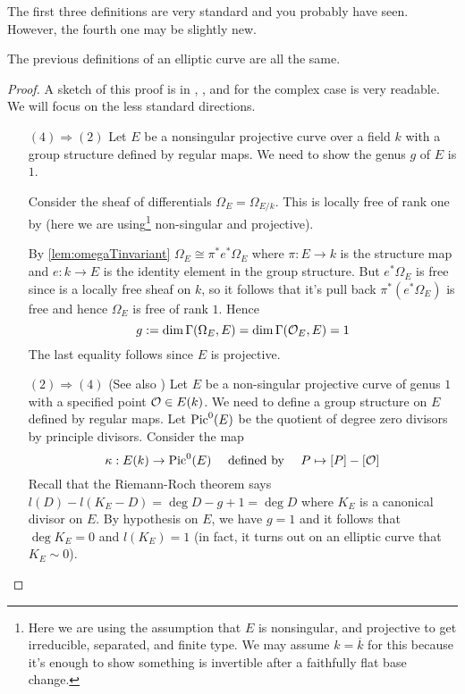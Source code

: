 \documentclass[11pt]{article}
\begin{document}
The first three definitions are very standard and you probably have seen. However, the fourth one may be slightly new.

\begin{prop}\label{ec:defs:equiv}
	The previous definitions of an elliptic curve are all the same.
\end{prop}
\begin{proof}
	A sketch of this proof is in \cite[Pg.~1]{milneAV}, \cite[Ch.~II]{milneEC}, and for the complex case \cite[Ch.~1.3]{diamondandshurman} is very readable. We will focus on the less standard directions.
	\begin{enumerate}
		\item[$(4)\Rightarrow(2)$] Let $E$ be a nonsingular projective curve over a field $k$ with a group structure defined by regular maps. We need to show the genus $g$ of $E$ is $1$.
		
		Consider the sheaf of differentials $\Omega_E=\Omega_{E/k}$. This is locally free of rank one by \cite[Thm.~II.8.15]{hartshorne} (here we are using\footnote{Here we are using the assumption that $E$ is nonsingular, and projective to get irreducible, separated, and finite type. We may assume $k=\overline{k}$ for this because it's enough to show something is invertible after a faithfully flat base change.} non-singular and projective).
		
		By \autoref{lem:omegaTinvariant}
		$\Omega_E \cong \pi^*e^*\Omega_E$ where $\pi:E \to k$ is the structure map and $e:k \to E$ is the identity element in the group structure. But $e^*\Omega_E$ is free since is a locally free sheaf on $k$, so it follows that it's pull back $\pi^*(e^*\Omega_E)$ is free and hence $\Omega_E$ is free of rank $1$. Hence
		$$
		g := \dim\Gamma(\Omega_E,E) = \dim\Gamma(\mathcal{O}_E,E) = 1
		$$
		The last equality follows since $E$ is projective.
	
		\item[$(2)\Rightarrow(4)$](See also \cite[Ch.~III.3]{silverman1}) Let $E$ be a non-singular projective curve of genus $1$ with a specified point $\mathcal{O}\in E(k)$. We need to define a group structure on $E$ defined by regular maps. Let $\operatorname{Pic}^0(E)$ be the quotient of degree zero divisors by principle divisors. Consider the map
		$$
		\kappa:E(k) \to \operatorname{Pic}^0(E) \quad\text{ defined by }\quad P \mapsto [P] - [\mathcal{O}]
		$$
		Recall that the Riemann-Roch theorem says $l(D) - l(K_E - D) = \deg D - g + 1 = \deg D$ where $K_E$ is a canonical divisor on $E$. By hypothesis on $E$, we have $g=1$ and it follows that $\deg K_E = 0$ and $l(K_E) = 1$ (in fact, it turns out on an elliptic curve that $K_E \sim 0$).
		

\end{enumerate}
\end{proof}
\end{document}
